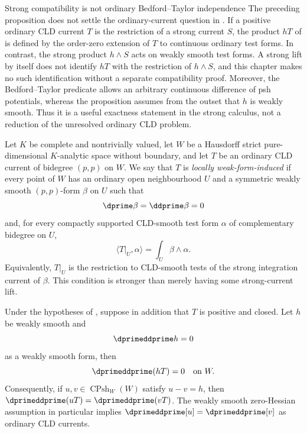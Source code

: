 \noindent\begin{minipage}{\textwidth}
\begin{warning}{Strong compatibility is not ordinary Bedford--Taylor independence}
\label{warn:ch18-strong-not-ordinary-bt}
The preceding proposition does not settle the ordinary-current question in
.  If a positive ordinary CLD current
$T$ is the restriction of a strong current $S$, the product $hT$ of
 is defined by the order-zero extension of $T$ to
continuous ordinary test forms.  In contrast, the strong product
$h\wedge S$ acts on weakly smooth test forms.  A strong lift by itself does
not identify $hT$ with the restriction of $h\wedge S$, and this chapter makes
no such identification without a separate compatibility proof.  Moreover,
the Bedford--Taylor predicate allows an arbitrary continuous difference of
psh potentials, whereas the proposition assumes from the outset that $h$ is
weakly smooth.  Thus it is a useful exactness statement in the strong
calculus, not a reduction of the unresolved ordinary CLD problem.
\end{warning}
\end{minipage}\par

\begin{definition}
\label{def:ch18-weak-form-induced-current}
Let $K$ be complete and nontrivially valued, let $W$ be a Hausdorff strict
pure-dimensional $K$-analytic space without boundary, and let $T$ be an
ordinary CLD current of bidegree $(p,p)$ on $W$.  We say that $T$ is
\emph{locally weak-form-induced} if every point of $W$ has an ordinary open
neighbourhood $U$ and a symmetric weakly smooth $(p,p)$-form $\beta$ on $U$
such that
\[
                 \dprime\beta=\ddprime\beta=0
\]
and, for every compactly supported CLD-smooth test form $\alpha$ of
complementary bidegree on $U$,
\begin{equation}
               \langle T|_U,\alpha\rangle=\int_U\beta\wedge\alpha.
\label{eq:ch18-weak-form-induced-current}
\end{equation}
Equivalently, $T|_U$ is the restriction to CLD-smooth tests of the strong
integration current of $\beta$.  This condition is stronger than merely
having some strong-current lift.
\end{definition}

\begin{proposition}
\label{prop:ch18-weak-form-induced-bt}
Under the hypotheses of
, suppose in addition that $T$ is
positive and closed.  Let $h$ be weakly smooth and
\[
                          \dprimeddprime h=0
\]
as a weakly smooth form, then
\[
                         \dprimeddprime(hT)=0
                         \quad\text{on }W.
\]
Consequently, if $u,v\in\operatorname{CPsh}_W(W)$ satisfy $u-v=h$, then
$\dprimeddprime(uT)=\dprimeddprime(vT)$.  The weakly smooth
zero-Hessian assumption in particular implies
$\dprimeddprime[u]=\dprimeddprime[v]$ as ordinary CLD currents.
\end{proposition}

